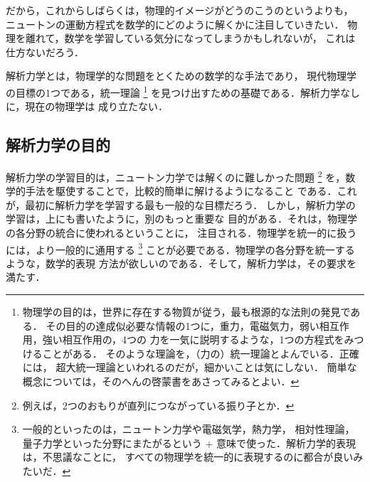             だから，これからしばらくは，物理的イメージがどうのこうのというよりも，
            ニュートンの運動方程式を数学的にどのように解くかに注目していきたい．
            物理を離れて，数学を学習している気分になってしまうかもしれないが，
            これは仕方ないだろう．

            解析力学とは，物理学的な問題をとくための数学的な手法であり，
            現代物理学の目標の1つである，統一理論
                \footnote{
                    物理学の目的は，世界に存在する物質が従う，最も根源的な法則の発見である．
                    その目的の達成似必要な情報の1つに，重力，電磁気力，弱い相互作用，強い相互作用の，4つの
                    力を一気に説明するような，1つの方程式をみつけることがある．
                    そのような理論を，（力の）統一理論とよんでいる．正確には，
                    超大統一理論といわれるのだが，細かいことは気にしない．
                    簡単な概念については，そのへんの啓蒙書をあさってみるとよい．
                }
            を見つけ出すための基礎である．解析力学なしに，現在の物理学は
            成り立たない．

        \subsection{解析力学の目的}
            解析力学の学習目的は，ニュートン力学では解くのに難しかった問題
                \footnote{
                    例えば，2つのおもりが直列につながっている振り子とか．
                }
            を，数学的手法を駆使することで，比較的簡単に解けるようになること
            である．これが，最初に解析力学を学習する最も一般的な目標だろう．
            しかし，解析力学の学習は，上にも書いたように，別のもっと重要な
            目的がある．それは，物理学の各分野の統合に使われるということに，
            注目される．物理学を統一的に扱うには，より一般的に通用する
                \footnote{
                    一般的といったのは，ニュートン力学や電磁気学，熱力学，
                    相対性理論，量子力学といった分野にまたがるという
          +          意味で使った．解析力学的表現は，不思議なことに，
                    すべての物理学を統一的に表現するのに都合が良いみたいだ．
                }
            ことが必要である．物理学の各分野を統一するような，数学的表現
            方法が欲しいのである．そして，解析力学は，その要求を満たす．

